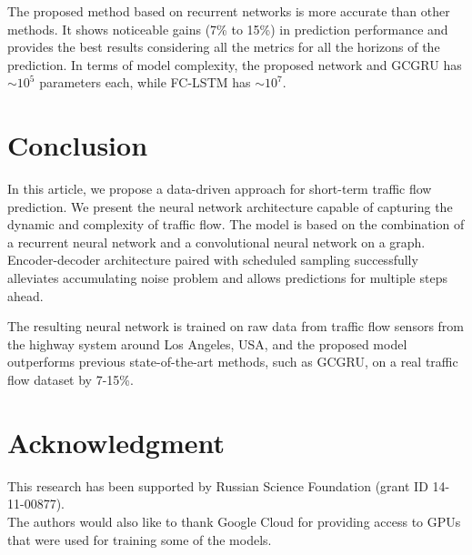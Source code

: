 \documentclass[letterpaper, 10 pt, conference]{ieeeconf}  %
\begin{document}
The proposed method based on recurrent networks is more accurate than other methods. It shows noticeable gains (7\% to 15\%) in prediction performance and provides the best results considering all the metrics for all the horizons of the prediction. In terms of model complexity, the proposed network and GCGRU has $\sim10^5$ parameters each, while FC-LSTM has $\sim 10^7$.


\section{Conclusion}

In this article, we propose a data-driven approach for short-term traffic flow prediction. We present the neural network architecture capable of capturing the dynamic and complexity of traffic flow. The model is based on the combination of a recurrent neural network and a convolutional neural network on a graph. Encoder-decoder architecture paired with scheduled sampling successfully alleviates accumulating noise problem and allows predictions for multiple steps ahead.

The resulting neural network is trained on raw data from traffic flow sensors from the highway system around Los Angeles, USA, and the proposed model outperforms previous state-of-the-art methods, such as GCGRU, on a real traffic flow dataset by 7-15\%.

\section*{Acknowledgment}

This research has been supported by Russian Science Foundation (grant ID 14-11-00877).\\
The authors would also like to thank Google Cloud for providing access to GPUs that were used for training some of the models.









 

\end{document}
